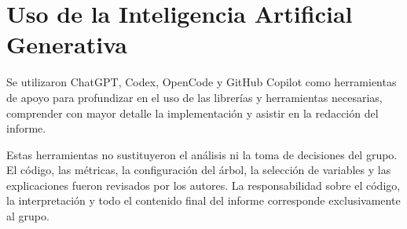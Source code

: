 \chapter{Uso de la Inteligencia Artificial Generativa} \label{chp:use-of-generative-ai}


Se utilizaron ChatGPT, Codex, OpenCode y GitHub Copilot como herramientas de apoyo para
profundizar en el uso de las librerías y herramientas necesarias, comprender
con mayor detalle la implementación y asistir en la redacción del informe.

Estas herramientas no sustituyeron el análisis ni la toma de decisiones del
grupo. El código, las métricas, la configuración del árbol, la selección de
variables y las explicaciones fueron revisados por los autores. La
responsabilidad sobre el código, la interpretación y todo el contenido final
del informe corresponde exclusivamente al grupo.
